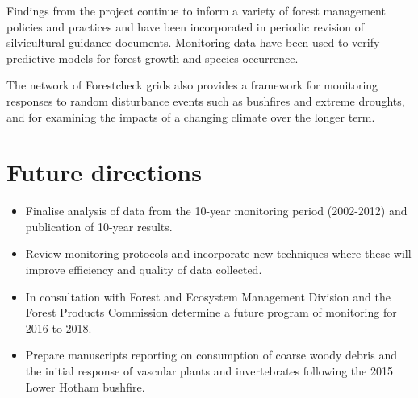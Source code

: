 \documentclass[version=last,
    paper=a4, %
    10pt, %
    usenames,
    dvipsnames,
    oneside, %
    headings=openany, %
    DIV=15 %
]{scrbook}
\begin{document}
Findings from the project continue to inform a variety of forest
management policies and practices and have been incorporated in periodic
revision of silvicultural guidance documents. Monitoring data have been
used to verify predictive models for forest growth and species
occurrence.

The network of Forestcheck grids also provides a framework for
monitoring responses to random disturbance events such as bushfires and
extreme droughts, and for examining the impacts of a changing climate
over the longer term.



\section*{Future directions}
\begin{itemize}
\itemsep1pt\parskip0pt
\item
  Finalise analysis of data from the 10-year monitoring period
  (2002-2012) and publication of 10-year results.
\item
  Review monitoring protocols and incorporate new techniques where these
  will improve efficiency and quality of data collected.
\item
  In consultation with Forest and Ecosystem Management Division and the
  Forest Products Commission determine a future program of monitoring
  for 2016 to 2018.
\item
  Prepare manuscripts reporting on consumption of coarse woody debris
  and the initial response of vascular plants and invertebrates
  following the 2015 Lower Hotham bushfire.
\end{itemize}



\end{document}
